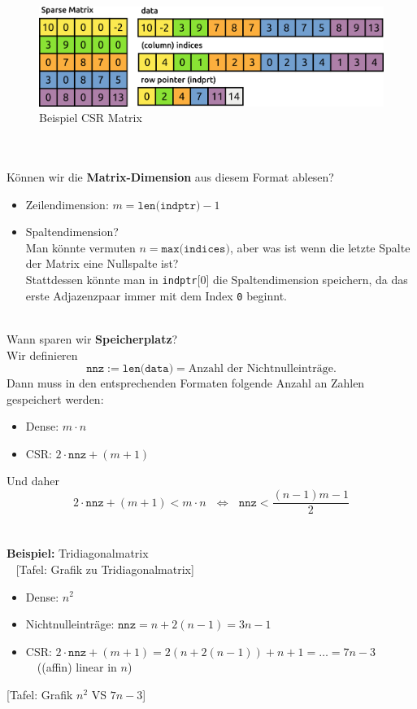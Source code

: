 \begin{figure}[h!]
	\centering
	\includegraphics[width=0.7\linewidth]{media/csr-matrix}
	\caption{Beispiel CSR Matrix}
	\label{fig:csr-matrix}
\end{figure}
~\\~\\
Können wir die \textbf{Matrix-Dimension} aus diesem Format ablesen?
\begin{itemize}
	\item Zeilendimension: $m = \texttt{len(indptr)} - 1$
	\item Spaltendimension?\\
			Man könnte vermuten $n=\texttt{max(indices)}$, aber was ist wenn die letzte Spalte der Matrix eine Nullspalte ist?\\
			Stattdessen könnte man in \texttt{indptr}[0] die Spaltendimension speichern, da das erste Adjazenzpaar immer mit dem Index \texttt{0} beginnt.
\end{itemize}
~\\
Wann sparen wir \textbf{Speicherplatz}?\\
Wir definieren $$\texttt{nnz} := \texttt{len(data)} = \text{Anzahl der Nichtnulleinträge}.$$
Dann muss in den entsprechenden Formaten folgende Anzahl an Zahlen gespeichert werden:
\begin{itemize}
	\item Dense: $m\cdot n$
	\item CSR: $2 \cdot \texttt{nnz} + (m+1)$
\end{itemize}
Und daher
$$2 \cdot \texttt{nnz} + (m+1) < m\cdot n ~~~\Leftrightarrow~~~ \texttt{nnz} < \frac{(n-1)m - 1}{2}$$
~\\~\\
\textbf{Beispiel:} Tridiagonalmatrix\\~
[Tafel: Grafik zu Tridiagonalmatrix]
\begin{itemize}
	\item Dense: $n^2$
	\item Nichtnulleinträge: $\texttt{nnz} = n + 2 (n-1) = 3n -1$
	\item CSR: $2 \cdot \texttt{nnz} + (m+1) = 2 (n + 2 (n-1)) + n+1 = \ldots = 7n -3$ ~~((affin) linear in $n$)
\end{itemize}
[Tafel: Grafik $n^2$ VS $7n -3$]
